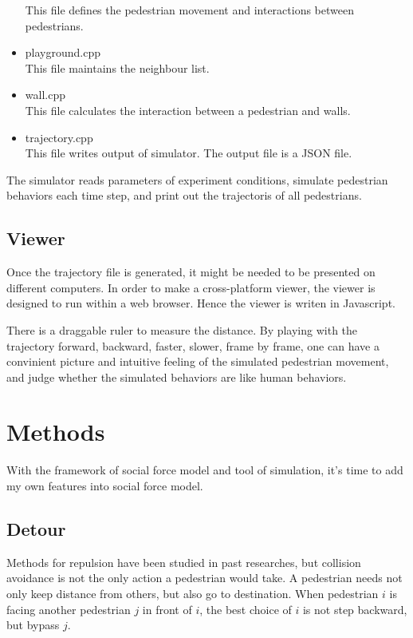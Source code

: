\documentclass{article}
\begin{document}
\begin{itemize}
                    This file defines the pedestrian movement and interactions between pedestrians.
                \item{playground.cpp} \\
                    This file maintains the neighbour list.
                \item{wall.cpp} \\
                    This file calculates the interaction between a pedestrian and walls.
                \item{trajectory.cpp} \\
                    This file writes output of simulator. The output file is a JSON file.
            \end{itemize}
            The simulator reads parameters of experiment conditions, simulate pedestrian behaviors each time step, and print out the trajectoris of all pedestrians.
        \subsection{Viewer}
            Once the trajectory file is generated, it might be needed to be presented on different computers.
            In order to make a cross-platform viewer, the viewer is designed to run within a web browser.
            Hence the viewer is writen in Javascript.

            There is a draggable ruler to measure the distance.
            By playing with the trajectory forward, backward, faster, slower, frame by frame, one can have a convinient picture and intuitive feeling of the simulated pedestrian movement, and judge whether the simulated behaviors are like human behaviors.


    \section{Methods}
        With the framework of social force model and tool of simulation, it's time to add my own features into social force model.
        \subsection{Detour}
            Methods for repulsion have been studied in past researches, but collision avoidance is not the only action a pedestrian would take. A pedestrian needs not only keep distance from others, but also go to destination.
            When pedestrian $i$ is facing another pedestrian $j$ in front of $i$, the best choice of $i$ is not step backward, but bypass $j$.
\end{document}
